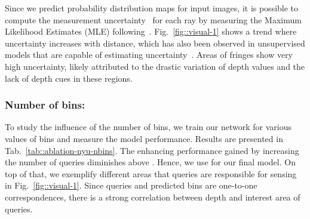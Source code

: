 \documentclass[runningheads]{llncs}
\begin{document}
Since we predict probability distribution maps for input images, it is possible to compute the measurement uncertainty~\cite{kendall2017uncertainties} for each ray by measuring the Maximum Likelihood Estimates (MLE) following~\cite{liu2019neural}. Fig.~\ref{fig::visual-1} shows a trend where uncertainty increases with distance, which has also been observed in unsupervised models that are capable of estimating uncertainty~\cite{johnston2020self}. Areas of fringes show very high uncertainty, likely attributed to the drastic variation of depth values and the lack of depth cues in these regions.


\begin{table}[t!]
    \caption{Ablation study on the NYU dataset: effect of number of bins (N) on performance. Similar to Adabins~\cite{bhat2021adabins}, we observe that performance starts to saturate as N increases above 64.}
    \centering
{}
    \label{tab::ablation-nyu-nbins}
\end{table}



%
 

\subsubsection{Number of bins:} To study the influence of the number of bins, we train our network for various values of  bins and measure the model performance. Results are presented in Tab.~\ref{tab::ablation-nyu-nbins}. The enhancing performance gained by increasing the number of queries diminishes above . Hence, we use  for our final model. On top of that, we exemplify different areas that queries are responsible for sensing in Fig.~\ref{fig::visual-1}. Since queries and predicted bins are one-to-one correspondences, there is a strong correlation between depth and interest area of queries.
\end{document}
